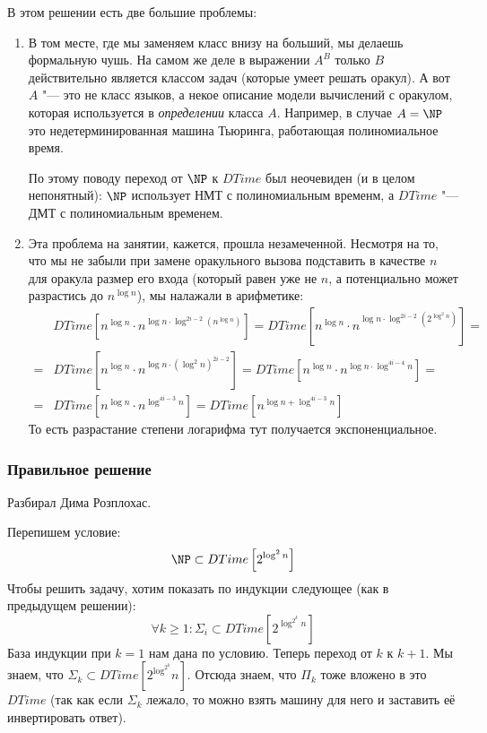 		В этом решении есть две большие проблемы:
		\begin{enumerate}
		\item
			В том месте, где мы заменяем класс внизу на больший, мы делаешь формальную чушь.
			На самом же деле в выражении $A^B$ только $B$ действительно является классом задач
			(которые умеет решать оракул).
			А вот $A$ "--- это не класс языков, а некое описание модели вычислений с оракулом,
			которая используется в \textit{определении} класса $A$.
			Например, в случае $A=\NP$ это недетерминированная машина Тьюринга, работающая полиномиальное время.

			По этому поводу переход от $\NP$ к $DTime$ был неочевиден (и в целом непонятный): $\NP$
			использует НМТ с полиномиальным временм, а $DTime$ "--- ДМТ с полиномиальным временем.
		\item
			Эта проблема на занятии, кажется, прошла незамеченной.
			Несмотря на то, что мы не забыли при замене оракульного вызова подставить в качестве $n$ для оракула
			размер его входа (который равен уже не $n$, а потенциально может разрастись до $n^{\log n}$), мы налажали в арифметике:
			\begin{align*}
				  &DTime[n^{\log n} \cdot n^{\log n \cdot \log^{2i-2} \left( n^{\log n} \right)}] =
				   DTime[n^{\log n} \cdot n^{\log n \cdot \log^{2i-2} \left( 2^{\log^2 n} \right)}] = \\
				= &DTime[n^{\log n} \cdot n^{\log n \cdot \left(\log^2 n\right)^{2i-2}}] =
				   DTime[n^{\log n} \cdot n^{\log n \cdot \log^{4i-4} n}] = \\
				= &DTime[n^{\log n} \cdot n^{\log^{4i-3} n}] =
				   DTime[n^{\log n + \log^{4i-3} n}]
			\end{align*}
			То есть разрастание степени логарифма тут получается экспоненциальное.
		\end{enumerate}

	\subsubsection{Правильное решение}
		Разбирал Дима Розплохас.

		Перепишем условие:
		\[ \NP \subset DTime\left[2^{\log^2 n}\right] \]
		Чтобы решить задачу, хотим показать по индукции следующее (как в предыдущем решении):
		\[ \forall k \ge 1 \colon \Sigma_i \subset DTime\left[2^{\log^{2^k} n}\right] \]
		База индукции при $k=1$ нам дана по условию.
		Теперь переход от $k$ к $k+1$.
		Мы знаем, что $\Sigma_k \subset DTime\left[2^{\log^{2^k}} n\right]$.
		Отсюда знаем, что $\Pi_k$ тоже вложено в это $DTime$
		(так как если $\Sigma_k$ лежало, то можно взять машину для него и заставить её инвертировать ответ).

